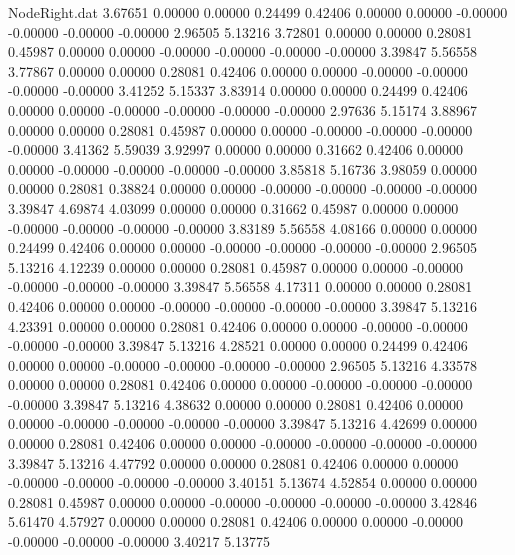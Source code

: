 \begin{filecontents}{NodeRight.dat}
   3.67651    0.00000    0.00000     0.24499    0.42406    0.00000    0.00000   -0.00000   -0.00000   -0.00000   -0.00000    2.96505    5.13216
   3.72801    0.00000    0.00000     0.28081    0.45987    0.00000    0.00000   -0.00000   -0.00000   -0.00000   -0.00000    3.39847    5.56558
   3.77867    0.00000    0.00000     0.28081    0.42406    0.00000    0.00000   -0.00000   -0.00000   -0.00000   -0.00000    3.41252    5.15337
   3.83914    0.00000    0.00000     0.24499    0.42406    0.00000    0.00000   -0.00000   -0.00000   -0.00000   -0.00000    2.97636    5.15174
   3.88967    0.00000    0.00000     0.28081    0.45987    0.00000    0.00000   -0.00000   -0.00000   -0.00000   -0.00000    3.41362    5.59039
   3.92997    0.00000    0.00000     0.31662    0.42406    0.00000    0.00000   -0.00000   -0.00000   -0.00000   -0.00000    3.85818    5.16736
   3.98059    0.00000    0.00000     0.28081    0.38824    0.00000    0.00000   -0.00000   -0.00000   -0.00000   -0.00000    3.39847    4.69874
   4.03099    0.00000    0.00000     0.31662    0.45987    0.00000    0.00000   -0.00000   -0.00000   -0.00000   -0.00000    3.83189    5.56558
   4.08166    0.00000    0.00000     0.24499    0.42406    0.00000    0.00000   -0.00000   -0.00000   -0.00000   -0.00000    2.96505    5.13216
   4.12239    0.00000    0.00000     0.28081    0.45987    0.00000    0.00000   -0.00000   -0.00000   -0.00000   -0.00000    3.39847    5.56558
   4.17311    0.00000    0.00000     0.28081    0.42406    0.00000    0.00000   -0.00000   -0.00000   -0.00000   -0.00000    3.39847    5.13216
   4.23391    0.00000    0.00000     0.28081    0.42406    0.00000    0.00000   -0.00000   -0.00000   -0.00000   -0.00000    3.39847    5.13216
   4.28521    0.00000    0.00000     0.24499    0.42406    0.00000    0.00000   -0.00000   -0.00000   -0.00000   -0.00000    2.96505    5.13216
   4.33578    0.00000    0.00000     0.28081    0.42406    0.00000    0.00000   -0.00000   -0.00000   -0.00000   -0.00000    3.39847    5.13216
   4.38632    0.00000    0.00000     0.28081    0.42406    0.00000    0.00000   -0.00000   -0.00000   -0.00000   -0.00000    3.39847    5.13216
   4.42699    0.00000    0.00000     0.28081    0.42406    0.00000    0.00000   -0.00000   -0.00000   -0.00000   -0.00000    3.39847    5.13216
   4.47792    0.00000    0.00000     0.28081    0.42406    0.00000    0.00000   -0.00000   -0.00000   -0.00000   -0.00000    3.40151    5.13674
   4.52854    0.00000    0.00000     0.28081    0.45987    0.00000    0.00000   -0.00000   -0.00000   -0.00000   -0.00000    3.42846    5.61470
   4.57927    0.00000    0.00000     0.28081    0.42406    0.00000    0.00000   -0.00000   -0.00000   -0.00000   -0.00000    3.40217    5.13775

\end{filecontents}
